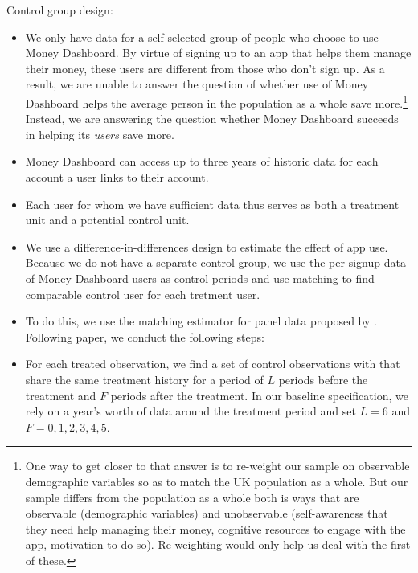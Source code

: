 Control group design:
\begin{itemize}

    \item We only have data for a self-selected group of people who choose to
        use Money Dashboard. By virtue of signing up to an app that helps them
        manage their money, these users are different from those who don't sign
        up. As a result, we are unable to answer the question of whether use of
        Money Dashboard helps the average person in the population as a whole
        save more.\footnote{One way to get closer to that answer is to
            re-weight our sample on observable demographic variables so as to
            match the UK population as a whole. But our sample differs from the
            population as a whole both is ways that are observable (demographic
            variables) and unobservable (self-awareness that they need help
            managing their money, cognitive resources to engage with the app,
            motivation to do so). Re-weighting would only help us deal with the
        first of these.} Instead, we are answering the question whether Money
        Dashboard succeeds in helping its \textit{users} save more.

    \item Money Dashboard can access up to three years of historic data for
        each account a user links to their account.

    \item Each user for whom we have sufficient data thus serves as both a
        treatment unit and a potential control unit.

    \item We use a difference-in-differences design to estimate the effect of
        app use. Because we do not have a separate control group, we use the
        per-signup data of Money Dashboard users as control periods and use
        matching to find comparable control user for each tretment user.

    \item To do this, we use the matching estimator for panel data proposed by
        \citet{imai2021matching}. Following paper, we conduct the following
        steps:

    \item For each treated observation, we find a set of control observations
        with that share the same treatment history for a period of $L$ periods
        before the treatment and $F$ periods after the treatment. In our
        baseline specification, we rely on a year's worth of data around the
        treatment period and set $L=6$ and $F = 0, 1, 2, 3, 4, 5$.


\end{itemize}
